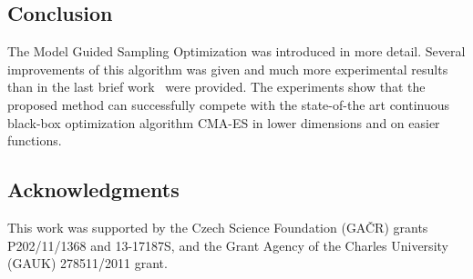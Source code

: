 \documentclass{itatnew}
\begin{document}
\subsection{Conclusion}

The Model Guided Sampling Optimization was introduced in more detail. Several improvements of this algorithm was given and much more experimental results than in the last brief work~\cite{bajer_model_2013} were provided. The experiments show that the proposed method can successfully compete with the state-of-the art continuous black-box optimization algorithm CMA-ES in lower dimensions and on easier functions.


% 
% 
% 





\subsection*{Acknowledgments}

This work was supported by the Czech Science Foundation (GA\v{C}R) grants \hbox{P202/11/1368} and \hbox{13-17187S}, and the Grant Agency of the Charles University (GAUK) \hbox{278511/2011} grant. 
\end{document}
